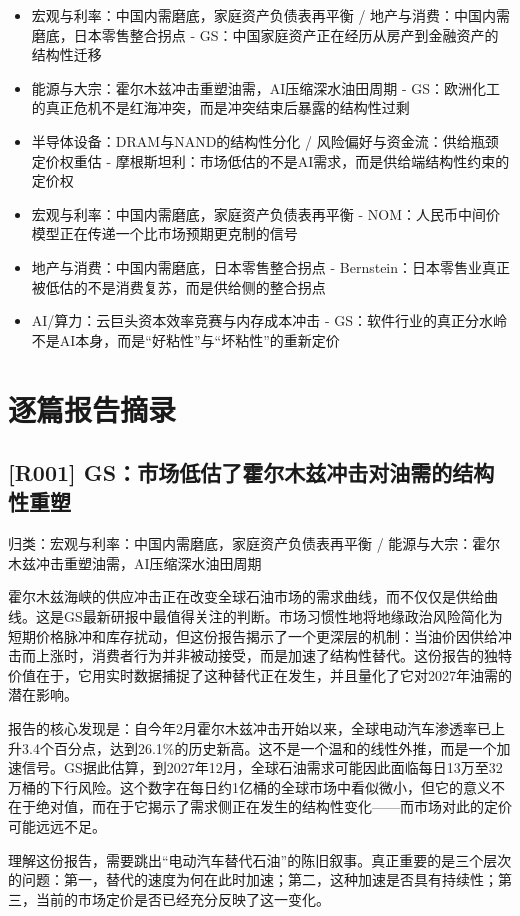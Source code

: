\documentclass[11pt]{ctexart}
\begin{document}
\begin{itemize}
  \item [R015] 宏观与利率：中国内需磨底，家庭资产负债表再平衡 / 地产与消费：中国内需磨底，日本零售整合拐点 - GS：中国家庭资产正在经历从房产到金融资产的结构性迁移
  \item [R016] 能源与大宗：霍尔木兹冲击重塑油需，AI压缩深水油田周期 - GS：欧洲化工的真正危机不是红海冲突，而是冲突结束后暴露的结构性过剩
  \item [R017] 半导体设备：DRAM与NAND的结构性分化 / 风险偏好与资金流：供给瓶颈定价权重估 - 摩根斯坦利：市场低估的不是AI需求，而是供给端结构性约束的定价权
  \item [R018] 宏观与利率：中国内需磨底，家庭资产负债表再平衡 - NOM：人民币中间价模型正在传递一个比市场预期更克制的信号
  \item [R019] 地产与消费：中国内需磨底，日本零售整合拐点 - Bernstein：日本零售业真正被低估的不是消费复苏，而是供给侧的整合拐点
  \item [R020] AI/算力：云巨头资本效率竞赛与内存成本冲击 - GS：软件行业的真正分水岭不是AI本身，而是“好粘性”与“坏粘性”的重新定价
\end{itemize}
\section{逐篇报告摘录}
\subsection{[R001] GS：市场低估了霍尔木兹冲击对油需的结构性重塑}
{\small\color{refgray}归类：宏观与利率：中国内需磨底，家庭资产负债表再平衡 / 能源与大宗：霍尔木兹冲击重塑油需，AI压缩深水油田周期}

霍尔木兹海峡的供应冲击正在改变全球石油市场的需求曲线，而不仅仅是供给曲线。这是GS最新研报中最值得关注的判断。市场习惯性地将地缘政治风险简化为短期价格脉冲和库存扰动，但这份报告揭示了一个更深层的机制：当油价因供给冲击而上涨时，消费者行为并非被动接受，而是加速了结构性替代。这份报告的独特价值在于，它用实时数据捕捉了这种替代正在发生，并且量化了它对2027年油需的潜在影响。

报告的核心发现是：自今年2月霍尔木兹冲击开始以来，全球电动汽车渗透率已上升3.4个百分点，达到26.1\%的历史新高。这不是一个温和的线性外推，而是一个加速信号。GS据此估算，到2027年12月，全球石油需求可能因此面临每日13万至32万桶的下行风险。这个数字在每日约1亿桶的全球市场中看似微小，但它的意义不在于绝对值，而在于它揭示了需求侧正在发生的结构性变化——而市场对此的定价可能远远不足。

理解这份报告，需要跳出“电动汽车替代石油”的陈旧叙事。真正重要的是三个层次的问题：第一，替代的速度为何在此时加速；第二，这种加速是否具有持续性；第三，当前的市场定价是否已经充分反映了这一变化。
\end{document}

